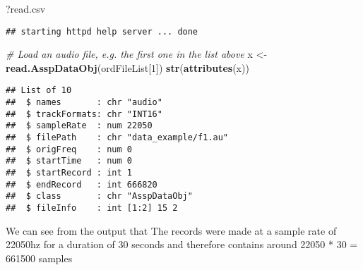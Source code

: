 \documentclass[]{article}
\newenvironment{Shaded}{\begin{snugshade}}{\end{snugshade}}
\newcommand{\KeywordTok}[1]{\textcolor[rgb]{0.13,0.29,0.53}{\textbf{#1}}}
\newcommand{\DecValTok}[1]{\textcolor[rgb]{0.00,0.00,0.81}{#1}}
\newcommand{\StringTok}[1]{\textcolor[rgb]{0.31,0.60,0.02}{#1}}
\newcommand{\CommentTok}[1]{\textcolor[rgb]{0.56,0.35,0.01}{\textit{#1}}}
\newcommand{\ControlFlowTok}[1]{\textcolor[rgb]{0.13,0.29,0.53}{\textbf{#1}}}
\newcommand{\OperatorTok}[1]{\textcolor[rgb]{0.81,0.36,0.00}{\textbf{#1}}}
\newcommand{\NormalTok}[1]{#1}
\begin{document}
\begin{Shaded}
\begin{Highlighting}[]
\NormalTok{?read.csv}
\end{Highlighting}
\end{Shaded}

\begin{verbatim}
## starting httpd help server ... done
\end{verbatim}

\begin{Shaded}
\begin{Highlighting}[]
\CommentTok{# Load an audio file, e.g. the first one in the list above}
\NormalTok{x <-}\StringTok{ }\KeywordTok{read.AsspDataObj}\NormalTok{(ordFileList[}\DecValTok{1}\NormalTok{])}
\KeywordTok{str}\NormalTok{(}\KeywordTok{attributes}\NormalTok{(x))}
\end{Highlighting}
\end{Shaded}

\begin{verbatim}
## List of 10
##  $ names       : chr "audio"
##  $ trackFormats: chr "INT16"
##  $ sampleRate  : num 22050
##  $ filePath    : chr "data_example/f1.au"
##  $ origFreq    : num 0
##  $ startTime   : num 0
##  $ startRecord : int 1
##  $ endRecord   : int 666820
##  $ class       : chr "AsspDataObj"
##  $ fileInfo    : int [1:2] 15 2
\end{verbatim}

\begin{Shaded}
\end{Shaded}

We can see from the output that The records were made at a sample rate
of 22050hz for a duration of 30 seconds and therefore contains around
22050 * 30 = 661500 samples
\end{document}
